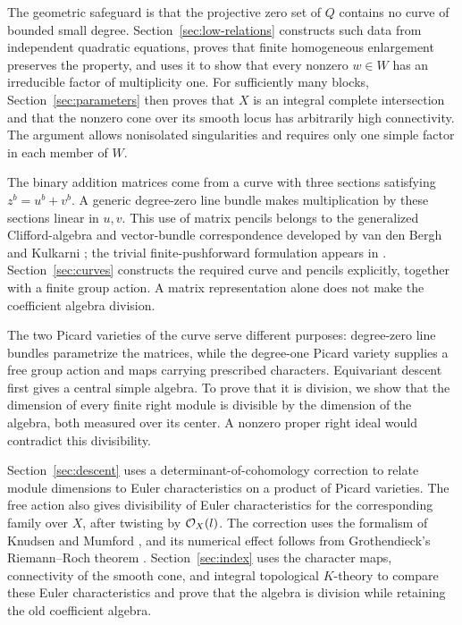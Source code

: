 The geometric safeguard is that the projective zero set of \(Q\)
contains no curve of bounded small degree. Section~\ref{sec:low-relations}
constructs such data from independent quadratic equations, proves that
finite homogeneous enlargement preserves the property, and uses it to
show that every nonzero \(w\in W\) has an irreducible factor of
multiplicity one. For sufficiently many blocks, Section~\ref{sec:parameters}
then proves that \(X\) is an integral
complete intersection and that the nonzero cone over its smooth locus
has arbitrarily high connectivity. The argument allows nonisolated
singularities and requires only one simple factor in each member of
\(W\).

The binary addition matrices come from a curve with three sections
satisfying \(z^b=u^b+v^b\). A generic degree-zero line bundle makes
multiplication by these sections linear in \(u,v\). This use of matrix
pencils belongs to the generalized Clifford-algebra and vector-bundle
correspondence developed by van den Bergh \cite{VanDenBergh87} and
Kulkarni \cite{Kulkarni03}; the trivial finite-pushforward formulation
appears in \cite[Proposition~2.5]{CKM12}.
Section~\ref{sec:curves} constructs the required curve and pencils
explicitly, together with a finite group action. A matrix representation
alone does not make the coefficient algebra division.

The two Picard varieties of the curve serve different purposes:
degree-zero line bundles parametrize the matrices, while the
degree-one Picard variety supplies a free group action and maps carrying
prescribed characters. Equivariant descent first gives a central simple
algebra. To prove that it is division, we show that the dimension of
every finite right module is divisible by the dimension of the algebra,
both measured over its center. A nonzero proper right ideal would
contradict this divisibility.

Section~\ref{sec:descent} uses a determinant-of-cohomology
correction to relate module dimensions to Euler characteristics on a
product of Picard varieties. The free action also gives divisibility
of Euler characteristics for the corresponding family over \(X\),
after twisting by \(\mathcal O_X(l)\). The correction uses the formalism of
Knudsen and Mumford
\cite{KnudsenMumford76}, and its numerical effect follows from
Grothendieck's Riemann--Roch theorem \cite{BorelSerre58}.
Section~\ref{sec:index} uses the character maps, connectivity of the
smooth cone, and integral topological \(K\)-theory to compare these
Euler characteristics and prove that the algebra is division while
retaining the old coefficient algebra.

